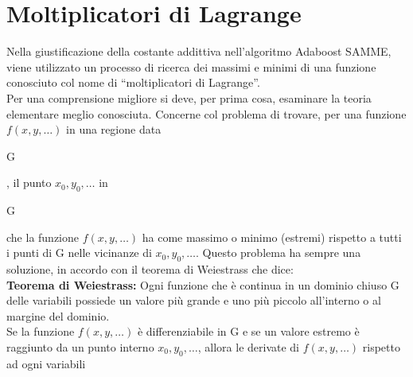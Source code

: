   
\section{Moltiplicatori di Lagrange}
Nella giustificazione della costante addittiva nell'algoritmo Adaboost SAMME, viene utilizzato un processo 
di ricerca dei massimi e minimi di una funzione conosciuto col nome di ``moltiplicatori di Lagrange''. \\
Per una comprensione migliore si deve, per prima cosa, esaminare la teoria elementare meglio conosciuta. 
Concerne col problema di trovare, per una funzione \begin{math}
                                                    f(x,y,\dots)
                                                   \end{math} in una regione data \begin{it}
                                                                                   G
                                                                                  \end{it}, il punto 
\begin{math}
 x_0, y_0, \dots 
\end{math} in \begin{it}G\end{it} che la funzione 
\begin{math} f(x,y,\dots) \end{math} ha come massimo o minimo (estremi) rispetto a tutti i punti di G nelle 
vicinanze di \begin{math}
              x_0, y_0, \dots
             \end{math}.
Questo problema ha sempre una soluzione, in accordo con il teorema di Weiestrass che dice:\\
 \textbf{Teorema di Weiestrass:} Ogni funzione che \`e continua in un dominio chiuso G delle variabili possiede 
un valore pi\`u grande e uno pi\`u piccolo all'interno o al margine del dominio.\\
Se la funzione \begin{math} f(x,y,\dots) \end{math} \`e differenziabile in G e se un valore estremo \`e 
raggiunto da un punto interno \begin{math}
              x_0, y_0, \dots
             \end{math}, allora le derivate di \begin{math} f(x,y,\dots) \end{math} rispetto ad ogni variabili 
